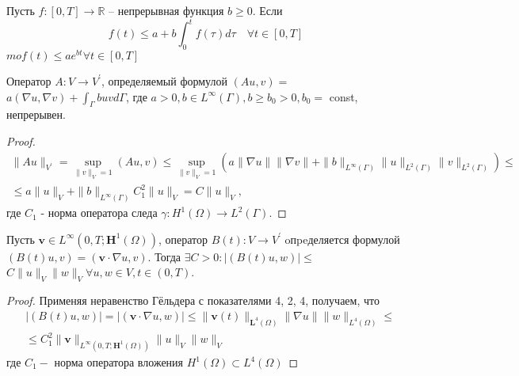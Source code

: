 \begin{lemma}[Гронуолл]
    \label{lm:1_7:24}\cite[191]{Gaevskii1978}
    Пусть $f:[0, T] \rightarrow \mathbb{R}$ -- непрерывная функция $b \geq 0$.
    Если
    \[
        f(t) \leq a+b \int_{0}^{t} f(\tau) d \tau \quad \forall t \in[0, T]
    \]
    $m o f(t) \leq a e^{b t} \forall t \in[0, T]$
\end{lemma}

\begin{lemma}
    \label{lm:1_7:25}
    Оператор $A: V \rightarrow V^{\prime}$, определяемый формулой
    $(A u, v)=$ $a(\nabla u, \nabla v)+\int_{\Gamma} b u v d \Gamma$,
    где $a>0, b \in L^{\infty}(\Gamma), b \geq b_{0}>0, b_{0}=$
    const, непрерывен.
\end{lemma}

\begin{proof}
    \[
        \begin{array}{r}
            \|A u\|_{V^{\prime}}=\sup _{\|v\|_{V}=1}(A u, v)
            \leq \sup _{\|v\|_{V}=1}\left(a\|\nabla u\|\|\nabla v\|
            +\|b\|_{L^{\infty}(\Gamma)}\|u\|_{L^{2}(\Gamma)}\|v\|_{L^{2}(\Gamma)}\right) \leq \\
            \leq a\|u\|_{V}+\|b\|_{L^{\infty}(\Gamma)} C_{1}^{2}\|u\|_{V}=C\|u\|_{V},
        \end{array}
    \]
    где $C_{1}$ - норма оператора следа
    $\gamma: H^{1}(\Omega) \rightarrow L^{2}(\Gamma)$.
\end{proof}

\begin{lemma}
    \label{lm:1_7:26}
    Пусть $\mathbf{v} \in L^{\infty} \left(0, T; \mathbf{H}^{1}(\Omega)\right)$,
    оператор $B(t): V \rightarrow V^{\prime}$ oпpeделяется формулой
    $(B(t) u, v)=(\mathbf{v} \cdot \nabla u, v)$.
    Тогда $\exists C>0:|(B(t) u, w)|
    \leq$ $C\|u\|_{V}\|w\|_{V} \forall u, w \in V, t \in(0, T)$.
\end{lemma}

\begin{proof}
    Применяя неравенство Гёльдера с показателями 4, 2, 4, получаем, что
    \[
        \begin{aligned}
            & |(B(t) u, w)|=|(\mathbf{v} \cdot \nabla u, w)|
            \leq\|\mathbf{v}(t)\|_{\mathbf{L}^{4}(\Omega)}
            \|\nabla u\|\|w\|_{L^{4}(\Omega)} \leq \\
            & \leq C_{1}^{2}\|\mathbf{v}\|_{L^{\infty}\left(0, T; \mathbf{H}^{1}
            (\Omega)\right)}\|u\|_{V}\|w\|_{V}
        \end{aligned}
    \]
    где $C_{1}-$ норма оператора вложения $H^{1}(\Omega) \subset L^{4}(\Omega)$
\end{proof}

